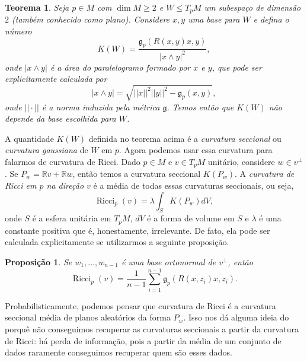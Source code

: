 \documentclass{article}
\newtheorem{proposition}[definition]{Proposição}
\newtheorem{theorem}[definition]{Teorema}
\DeclareMathOperator{\Ricci}{Ricci}
\begin{document}
\begin{theorem}
    Seja $p \in M$ com $\dim M \geq 2$ e $W \leq T_pM$ um subespaço de dimensão $2$ (também conhecido como plano). Considere $x, y$ uma base para $W$ e defina o número \begin{equation}
        K(W) = \frac{\mathfrak{g}_p(R(x,y)x, y)}{|x \wedge y|^2},
    \end{equation} onde $|x \wedge y|$ é a área do paralelogramo formado por $x$ e $y$, que pode ser explicitamente calculada por \begin{equation}
        |x \wedge y| = \sqrt{||x||^2||y||^2 - \mathfrak{g}_p(x,y)},
    \end{equation} onde $||\cdot||$ é a norma induzida pela métrica $\mathfrak{g}$. Temos então que $K(W)$ não depende da base escolhida para $W$.
\end{theorem}

A quantidade $K(W)$ definida no teorema acima é a \textit{curvatura seccional} ou \textit{curvatura gaussiana} de $W$ em $p$. Agora podemos usar essa curvatura para falarmos de curvatura de Ricci. Dado $p \in M$ e $v \in T_pM$ unitário, considere $w \in v^\perp$. Se $P_w = \mathbb{R}v + \mathbb{R}w$, então temos a curvatura seccional $K(P_w)$. A \textit{curvatura de Ricci em $p$ na direção $v$} é a média de todas essas curvaturas seccionais, ou seja, \begin{equation}
    \Ricci_p(v) = \lambda\int_S K(P_w)dV,
\end{equation} onde $S$ é a esfera unitária em $T_pM$, $dV$ é a forma de volume em $S$ e $\lambda$ é uma constante positiva que é, honestamente, irrelevante. De fato, ela pode ser calculada explicitamente se utilizarmos a seguinte proposição.

\begin{proposition}
    Se $w_1, \dots, w_{n-1}$ é uma base ortonormal de $v^\perp$, então \begin{equation}
        \Ricci_p(v) = \frac{1}{n-1}\sum_{i = 1}^{n - 1} \mathfrak{g}_p(R(x, z_i)x, z_i).
    \end{equation}
\end{proposition}

Probabilisticamente, podemos pensar que curvatura de Ricci é a curvatura seccional média de planos aleatórios da forma $P_w$. Isso nos dá alguma ideia do porquê não conseguimos recuperar as curvaturas seccionais a partir da curvatura de Ricci: há perda de informação, pois a partir da média de um conjunto de dados raramente conseguimos recuperar quem são esses dados.
\end{document}
